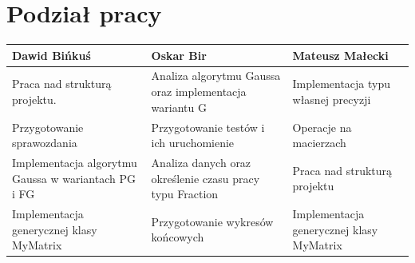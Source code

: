 \documentclass[10pt]{article}
\begin{document}
\section{Podział pracy}
\centering
	\begin{tabular}{| p{4.4cm} | p{4.4cm} | p{4.4cm} |}
		\hline
		\textbf{Dawid Bińkuś} & \textbf{Oskar Bir} & \textbf{Mateusz Małecki} \\ \hline
		Praca nad strukturą projektu. & Analiza algorytmu Gaussa oraz implementacja wariantu G & Implementacja typu własnej precyzji \\ \hline
		Przygotowanie sprawozdania & Przygotowanie testów i ich uruchomienie & Operacje na macierzach\\ \hline
		Implementacja algorytmu Gaussa w wariantach PG i FG & Analiza danych oraz określenie czasu pracy typu Fraction & Praca nad strukturą projektu \\ \hline
		Implementacja generycznej klasy MyMatrix & Przygotowanie wykresów końcowych & Implementacja generycznej klasy MyMatrix \\ \hline
		
		
		
	\end{tabular}
\end{document}
